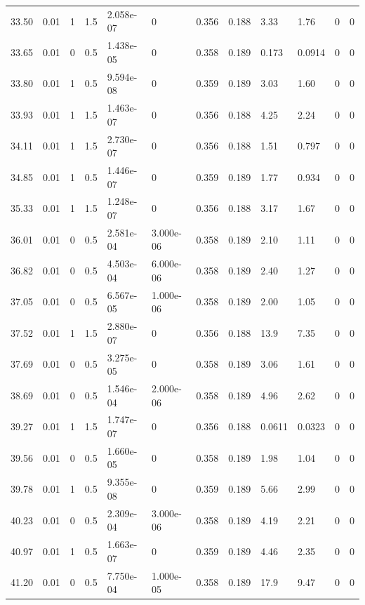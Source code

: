 \documentclass[preview]{standalone}
\begin{document}
{{{\begin{tabular}{L{1.2cm}C{1.2cm} C{0.3cm}C{0.5cm} C{1.4cm}C{1.4cm} C{1.4cm}C{1.4cm} C{1.6cm}C{1.6cm} C{1.6cm}C{1.6cm}}
  33.50  &  0.01  & 1     & 1.5 &  2.058e-07  & 0  &  0.356&   0.188& 3.33 & 1.76   &  0 & 0  \\ 
  33.65  &  0.01  & 0     & 0.5 &  1.438e-05  & 0  &  0.358&   0.189& 0.173 & 0.0914   &  0 & 0  \\ 
  33.80  &  0.01  & 1     & 0.5 &  9.594e-08  & 0  &  0.359&   0.189& 3.03 & 1.60   &  0 & 0  \\ 
  33.93  &  0.01  & 1     & 1.5 &  1.463e-07  & 0  &  0.356&   0.188& 4.25 & 2.24   &  0 & 0  \\ 
  34.11  &  0.01  & 1     & 1.5 &  2.730e-07  & 0  &  0.356&   0.188& 1.51 & 0.797   &  0 & 0  \\ 
  34.85  &  0.01  & 1     & 0.5 &  1.446e-07  & 0  &  0.359&   0.189& 1.77 & 0.934   &  0 & 0  \\ 
  35.33  &  0.01  & 1     & 1.5 &  1.248e-07  & 0  &  0.356&   0.188& 3.17 & 1.67   &  0 & 0  \\ 
  36.01  &  0.01  & 0     & 0.5 &  2.581e-04  & 3.000e-06  &  0.358&   0.189& 2.10 & 1.11   &  0 & 0  \\ 
  36.82  &  0.01  & 0     & 0.5 &  4.503e-04  & 6.000e-06  &  0.358&   0.189& 2.40 & 1.27   &  0 & 0  \\ 
  37.05  &  0.01  & 0     & 0.5 &  6.567e-05  & 1.000e-06  &  0.358&   0.189& 2.00 & 1.05   &  0 & 0  \\ 
  37.52  &  0.01  & 1     & 1.5 &  2.880e-07  & 0  &  0.356&   0.188& 13.9 & 7.35   &  0 & 0  \\ 
  37.69  &  0.01  & 0     & 0.5 &  3.275e-05  & 0  &  0.358&   0.189& 3.06 & 1.61   &  0 & 0  \\ 
  38.69  &  0.01  & 0     & 0.5 &  1.546e-04  & 2.000e-06  &  0.358&   0.189& 4.96 & 2.62   &  0 & 0  \\ 
  39.27  &  0.01  & 1     & 1.5 &  1.747e-07  & 0  &  0.356&   0.188& 0.0611 & 0.0323   &  0 & 0  \\ 
  39.56  &  0.01  & 0     & 0.5 &  1.660e-05  & 0  &  0.358&   0.189& 1.98 & 1.04   &  0 & 0  \\ 
  39.78  &  0.01  & 1     & 0.5 &  9.355e-08  & 0  &  0.359&   0.189& 5.66 & 2.99   &  0 & 0  \\ 
  40.23  &  0.01  & 0     & 0.5 &  2.309e-04  & 3.000e-06  &  0.358&   0.189& 4.19 & 2.21   &  0 & 0  \\ 
  40.97  &  0.01  & 1     & 0.5 &  1.663e-07  & 0  &  0.359&   0.189& 4.46 & 2.35   &  0 & 0  \\ 
  41.20  &  0.01  & 0     & 0.5 &  7.750e-04  & 1.000e-05  &  0.358&   0.189& 17.9 & 9.47   &  0 & 0  \\ 

\end{tabular}}}}
\end{document}
